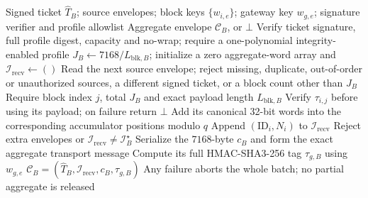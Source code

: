\begin{algorithm}[t]
\caption{Exact-Roster Authenticated Aggregation}
\label{alg:agg}
\small
\begin{algorithmic}[1]
\Require Signed ticket $\widehat{T}_B$; source envelopes; block keys $\{w_{i,e}\}$;
 gateway key $w_{g,e}$; signature verifier and profile allowlist
\Ensure Aggregate envelope $\mathcal{C}_B$, or $\bot$
\State Verify ticket signature, full profile digest, capacity and no-wrap;
 require a one-polynomial integrity-enabled profile
\State $J_B\gets7168/L_{\mathrm{blk},B}$;
 initialize a zero aggregate-word array and $\mathcal{I}_{\mathrm{recv}}\gets()$
 \State Read the next source envelope; reject missing, duplicate, out-of-order
 or unauthorized sources, a different signed ticket, or a block count other than $J_B$
  \State Require block index $j$, total $J_B$ and exact payload length $L_{\mathrm{blk},B}$
  \State Verify $\tau_{i,j}$ before using its payload; on failure return $\bot$
  \State Add its canonical 32-bit words into the corresponding accumulator positions modulo $q$
 \EndFor
 \State Append $(\mathrm{ID}_i,N_i)$ to $\mathcal{I}_{\mathrm{recv}}$
\EndFor
\State Reject extra envelopes or $\mathcal{I}_{\mathrm{recv}}\neq\mathcal{I}^{\star}_B$
\State Serialize the $7168$-byte $c_B$ and form the exact aggregate transport message
\State Compute its full HMAC-SHA3-256 tag $\tau_{g,B}$ using $w_{g,e}$
\State \Return $\mathcal{C}_B=(\widehat{T}_B,\mathcal{I}_{\mathrm{recv}},c_B,\tau_{g,B})$
\Statex Any failure aborts the whole batch; no partial aggregate is released
\end{algorithmic}
\end{algorithm}

